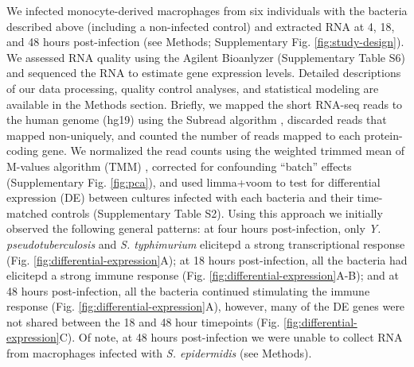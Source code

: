 We infected monocyte-derived macrophages from six individuals with the
bacteria described above (including a non-infected control) and
extracted RNA at 4, 18, and 48 hours post-infection (see Methods;
Supplementary Fig. \ref{fig:study-design}). We assessed RNA quality using the Agilent
Bioanlyzer (Supplementary Table S6) and sequenced the RNA to estimate
gene expression levels. Detailed descriptions of our data processing,
quality control analyses, and statistical modeling are available in
the Methods section. Briefly, we mapped the short RNA-seq reads to the
human genome (hg19) using the Subread algorithm \citep{Liao2013},
discarded reads that mapped non-uniquely, and counted the number of
reads mapped to each protein-coding gene. We normalized the read
counts using the weighted trimmed mean of M-values algorithm (TMM)
\citep{Robinson2010}, corrected for confounding ``batch'' effects
(Supplementary Fig. \ref{fig:pca}), and used limma+voom \citep{Smyth2004,
  Smyth2005, Law2014} to test for differential expression (DE) between
cultures infected with each bacteria and their time-matched controls
(Supplementary Table S2). Using this approach we initially observed
the following general patterns: at four hours post-infection, only
\emph{Y. pseudotuberculosis} and \emph{S. typhimurium} elicitepd a
strong transcriptional response (Fig.
\ref{fig:differential-expression}A); at 18 hours post-infection, all
the bacteria had elicitepd a strong immune response
(Fig. \ref{fig:differential-expression}A-B); and at 48 hours
post-infection, all the bacteria continued stimulating the immune
response (Fig. \ref{fig:differential-expression}A), however, many of
the DE genes were not shared between the 18 and 48 hour timepoints
(Fig. \ref{fig:differential-expression}C). Of note, at 48 hours
post-infection we were unable to collect RNA from macrophages infected
with \emph{S.  epidermidis} (see Methods).

